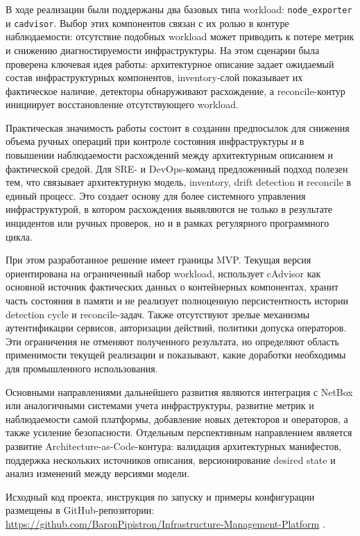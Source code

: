 В ходе реализации были поддержаны два базовых типа workload: \texttt{node\_exporter} и \texttt{cadvisor}. Выбор этих компонентов связан с их ролью в контуре наблюдаемости: отсутствие подобных workload может приводить к потере метрик и снижению диагностируемости инфраструктуры. На этом сценарии была проверена ключевая идея работы: архитектурное описание задает ожидаемый состав инфраструктурных компонентов, inventory-слой показывает их фактическое наличие, детекторы обнаруживают расхождение, а reconcile-контур инициирует восстановление отсутствующего workload.

Практическая значимость работы состоит в создании предпосылок для снижения объема ручных операций при контроле состояния инфраструктуры и в повышении наблюдаемости расхождений между архитектурным описанием и фактической средой. Для SRE- и DevOps-команд предложенный подход полезен тем, что связывает архитектурную модель, inventory, drift detection и reconcile в единый процесс. Это создает основу для более системного управления инфраструктурой, в котором расхождения выявляются не только в результате инцидентов или ручных проверок, но и в рамках регулярного программного цикла.

При этом разработанное решение имеет границы MVP. Текущая версия ориентирована на ограниченный набор workload, использует cAdvisor как основной источник фактических данных о контейнерных компонентах, хранит часть состояния в памяти и не реализует полноценную персистентность истории detection cycle и reconcile-задач. Также отсутствуют зрелые механизмы аутентификации сервисов, авторизации действий, политики допуска операторов. Эти ограничения не отменяют полученного результата, но определяют область применимости текущей реализации и показывают, какие доработки необходимы для промышленного использования.

Основными направлениями дальнейшего развития являются интеграция с NetBox или аналогичными системами учета инфраструктуры, развитие метрик и наблюдаемости самой платформы, добавление новых детекторов и операторов, а также усиление безопасности. Отдельным перспективным направлением является развитие Architecture-as-Code-контура: валидация архитектурных манифестов, поддержка нескольких источников описания, версионирование desired state и анализ изменений между версиями модели.

Исходный код проекта, инструкция по запуску и примеры конфигурации размещены в GitHub-репозитории: \url{https://github.com/BaronPipistron/Infrastructure-Management-Platform} \cite{infrastructure_management_platform_repo}.

